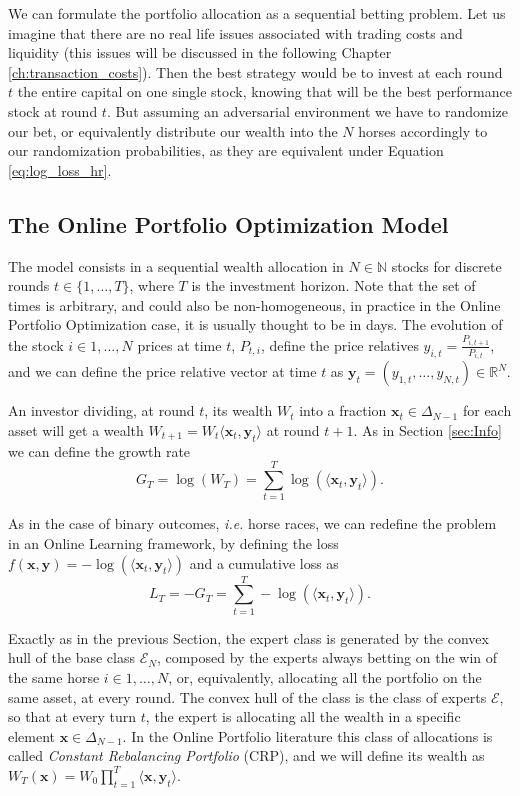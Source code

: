 We can formulate the portfolio allocation as a sequential betting problem. Let us imagine that there are no real life issues associated with trading costs and liquidity (this issues will be discussed in the following Chapter \ref{ch:transaction_costs}). Then the best strategy would be to invest at each round $t$ the entire capital on one single stock, knowing that will be the best performance stock at round $t$. But assuming an adversarial environment we have to randomize our bet, or equivalently distribute our wealth into the $N$ horses accordingly to our randomization probabilities, as they are equivalent under Equation \eqref{eq:log_loss_hr}. 

\subsection{The Online Portfolio Optimization Model}

The model consists in a sequential wealth allocation in $N\in\mathbb N$ stocks for discrete rounds $t\in\{1,\ldots,T\}$, where $T$ is the investment horizon. Note that the set of times is arbitrary, and could also be non-homogeneous, in practice in the Online Portfolio Optimization case, it is usually thought to be in days. The evolution of the stock $i\in 1,\ldots,N$ prices at time $t$, $P_{t,i}$, define the price relatives $y_{i,t}=\frac{P_{i,t+1}}{P_{i,t}}$, and we can define the price relative vector at time $t$ as $\mathbf y_t=(y_{1,t},\ldots,y_{N,t})\in\mathbb R^N$. 

An investor dividing, at round $t$, its wealth $W_t$ into a fraction $\mathbf x_t\in\Delta_{N-1}$ for each asset will get a wealth $W_{t+1}=W_t\langle \mathbf x_t,\mathbf y_t\rangle$ at round $t+1$. As in Section \ref{sec:Info} we can define the growth rate 
$$G_T=\log(W_T)=\sum\limits_{t=1}^T\log(\langle\mathbf x_t, \mathbf y_t\rangle).$$

As in the case of binary outcomes, \emph{i.e.} horse races, we can redefine the problem in an Online Learning framework, by defining the loss $f(\mathbf x,\mathbf y)=-\log(\langle\mathbf x_t, \mathbf y_t\rangle)$ and a cumulative loss as 
$$L_T=-G_T=\sum\limits_{t=1}^T-\log(\langle\mathbf x_t,\mathbf y_t\rangle).$$

Exactly as in the previous Section, the expert class is generated by the convex hull of the base class $\mathcal E_N$, composed by the experts always betting on the win of the same horse $i\in1,\ldots,N$, or, equivalently, allocating all the portfolio on the same asset, at every round. The convex hull of the class is the class of experts $\mathcal E$, so that at every turn $t$, the expert is allocating all the wealth in a specific element $\mathbf x\in\Delta_{N-1}$. In the Online Portfolio literature this class of allocations is called \emph{Constant Rebalancing Portfolio} (CRP), and we will define its wealth as $W_T(\mathbf x)=W_0\prod\limits_{t=1}^T\langle\mathbf x,\mathbf y_t\rangle$.

